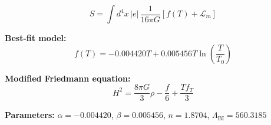 
\begin{equation}
  S = \int d^4x \, |e| \, \frac{1}{16\pi G} \left[ f(T) + \mathcal{L}_m \right]
\end{equation}

\textbf{Best-fit model:}
\begin{equation}
  f(T) = -0.004420 T + 0.005456 T \ln\!\left(\frac{T}{T_0}\right)
\end{equation}

\textbf{Modified Friedmann equation:}
\begin{equation}
  H^2 = \frac{8\pi G}{3} \rho - \frac{f}{6} + \frac{T f_T}{3}
\end{equation}

\textbf{Parameters:}
$\alpha = -0.004420$, \quad
$\beta = 0.005456$, \quad
$n = 1.8704$, \quad
$\Lambda_{\text{BI}} = 560.3185$